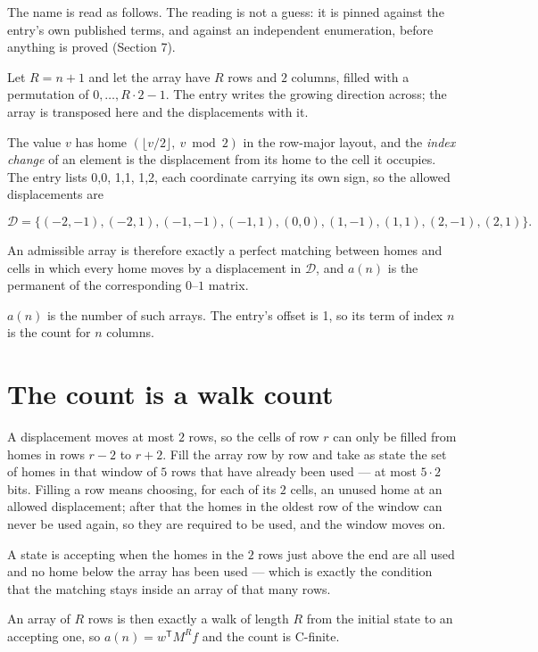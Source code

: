 \documentclass[11pt]{article}
\theoremstyle{definition}
\begin{document}
The name is read as follows. The reading is not a guess: it is pinned against the entry's own published terms, and against an independent enumeration, before anything is proved (Section 7).

Let $R = n + 1$ and let the array have $R$ rows and $2$ columns, filled with a permutation of $0,\dots,R\cdot2-1$. The entry writes the growing direction across; the array is transposed here and the displacements with it.

The value $v$ has home $(\lfloor v/2\rfloor,\ v \bmod 2)$ in the row-major layout, and the {\itshape index change} of an element is the displacement from its home to the cell it occupies. The entry lists 0,0, 1,1, 1,2, each coordinate carrying its own sign, so the allowed displacements are

\[\mathcal{D} = \{(-2,-1), (-2,1), (-1,-1), (-1,1), (0,0), (1,-1), (1,1), (2,-1), (2,1)\}.\]

An admissible array is therefore exactly a perfect matching between homes and cells in which every home moves by a displacement in $\mathcal{D}$, and $a(n)$ is the permanent of the corresponding $0$--$1$ matrix.

$a(n)$ is the number of such arrays. The entry's offset is 1, so its term of index $n$ is the count for $n$ columns.

\section{The count is a walk count}

A displacement moves at most $2$ rows, so the cells of row $r$ can only be filled from homes in rows $r-2$ to $r+2$. Fill the array row by row and take as state the set of homes in that window of $5$ rows that have already been used --- at most $5\cdot2$ bits. Filling a row means choosing, for each of its $2$ cells, an unused home at an allowed displacement; after that the homes in the oldest row of the window can never be used again, so they are required to be used, and the window moves on.

A state is accepting when the homes in the $2$ rows just above the end are all used and no home below the array has been used --- which is exactly the condition that the matching stays inside an array of that many rows.

An array of $R$ rows is then exactly a walk of length $R$ from the initial state to an accepting one, so $a(n) = w^{\mathsf T}M^{R}f$ and the count is C-finite.
\end{document}
